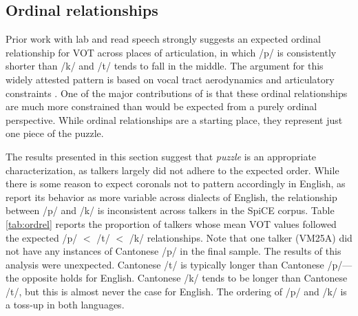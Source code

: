 \subsection{Ordinal relationships}\label{ch4:sec:ordrel}

Prior work with lab and read speech strongly suggests an expected ordinal relationship for VOT across places of articulation, in which /p/ is consistently shorter than /k/ and /t/ tends to fall in the middle. The argument for this widely attested pattern is based on vocal tract aerodynamics and articulatory constraints \citep{cho_1999_vot}. One of the major contributions of \citet{chodroff_2017_structure} is that these ordinal relationships are much more constrained than would be expected from a purely ordinal perspective. While ordinal relationships are a starting place, they represent just one piece of the puzzle. 

The results presented in this section suggest that \textit{puzzle} is an appropriate characterization, as talkers largely did not adhere to the expected order. While there is some reason to expect coronals not to pattern accordingly in English, as \citeauthor{chodroff_2017_structure} report its behavior as more variable across dialects of English, the relationship between /p/ and /k/ is inconsistent across talkers in the SpiCE corpus. Table \ref{tab:ordrel} reports the proportion of talkers whose mean VOT values followed the expected /p/ $<$ /t/ $<$ /k/ relationships. Note that one talker (VM25A) did not have any instances of Cantonese /p/ in the final sample. The results of this analysis were unexpected. Cantonese /t/ is typically longer than Cantonese /p/---the opposite holds for English. Cantonese /k/ tends to be longer than Cantonese /t/, but this is almost never the case for English. The ordering of /p/ and /k/ is a toss-up in both languages. 

